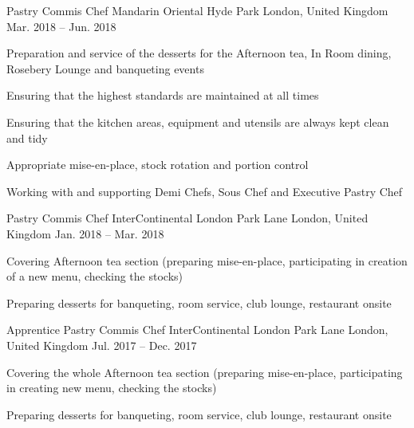\begin{cventries}
  \cventry
    {Pastry Commis Chef} %
    {Mandarin Oriental Hyde Park} %
    {London, United Kingdom} %
    {Mar. 2018 -- Jun. 2018} %
    {
      \begin{cvitems} %
        \item {Preparation and service of the desserts for the Afternoon tea, In Room dining, Rosebery Lounge and banqueting events}
        \item {Ensuring that the highest standards are maintained at all times}
        \item {Ensuring that the kitchen areas, equipment and utensils are always kept clean and tidy}
        \vfill\null
        \columnbreak
        \item {Appropriate mise-en-place, stock rotation and portion control}
        \item {Working with and supporting Demi Chefs, Sous Chef and Executive Pastry Chef}
      \end{cvitems}
    }

  \cventry
    {Pastry Commis Chef} %
    {InterContinental London Park Lane} %
    {London, United Kingdom} %
    {Jan. 2018 -- Mar. 2018} %
    {
      \begin{cvitems} %
        \item {Covering Afternoon tea section (preparing mise-en-place, participating in creation of a new menu, checking the stocks)}
        \item {Preparing desserts for banqueting, room service, club lounge, restaurant onsite}
      \end{cvitems}
    }

  \cventry
    {Apprentice Pastry Commis Chef} %
    {InterContinental London Park Lane} %
    {London, United Kingdom} %
    {Jul. 2017 -- Dec. 2017} %
    {
      \begin{cvitems} %
        \item {Covering the whole Afternoon tea section (preparing mise-en-place, participating in creating new menu, checking the stocks)}
        \item {Preparing desserts for banqueting, room service, club lounge, restaurant onsite}
      \end{cvitems}
    }


\end{cventries}
